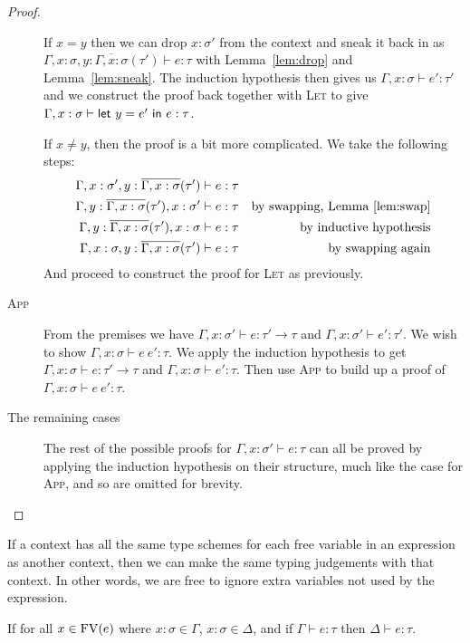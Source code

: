 \begin{proof}
\begin{description}
    If $x = y$ then we can drop $x :
    \sigma'$ from the context and sneak it back in as $\Gamma , x : \sigma, y :
    \overline{\Gamma, x : \sigma}(\tau') \vdash e : \tau$ with Lemma~\ref{lem:drop} and
    Lemma~\ref{lem:sneak}. The induction hypothesis then gives us $\Gamma ,
    x : \sigma \vdash e' : \tau'$ and we construct the proof back together with
    \textsc{Let} to give $\Gamma , x : \sigma \vdash \mathsf{let} \ y = e' \ \mathsf{in} \ e : \tau$.

    If $x \neq y$, then the proof is a bit more complicated. We take the
    following steps:
    \begin{align*}
      \Gamma , x : \sigma' , y : \overline{\Gamma, x : \sigma}(\tau') \vdash e : \tau \\
      \Gamma , y : \overline{\Gamma, x : \sigma}(\tau') , x : \sigma' \vdash e : \tau &&  \text{by
                                                            swapping,
                                                            Lemma~\ref{lem:swap}}
      \\
      \Gamma , y : \overline{\Gamma, x : \sigma}(\tau') , x : \sigma \vdash e : \tau && \text{by
                                                           inductive
                                                           hypothesis} \\
      \Gamma , x : \sigma , y : \overline{\Gamma, x : \sigma}(\tau') \vdash e : \tau && \text{by swapping again}
    \end{align*}
    And proceed to construct the proof for \textsc{Let} as previously.
  \item[\rm\textsc{App}]
    From the premises we have $\Gamma , x : \sigma' \vdash e : \tau' \rightarrow \tau$ and $\Gamma , x : \sigma' \vdash
    e' : \tau'$. We wish to show $\Gamma , x : \sigma \vdash e \ e' : \tau$.
    We apply the induction hypothesis to get $\Gamma , x : \sigma \vdash e : \tau' \rightarrow \tau$
    and  $\Gamma , x : \sigma \vdash e' : \tau$. Then use \textsc{App} to build up a
    proof of $\Gamma , x : \sigma \vdash e \ e' : \tau$.
  \item[The remaining cases] The rest of the possible proofs for
    $\Gamma , x : \sigma' \vdash e : \tau$ can all be proved by applying the
    induction hypothesis on their structure, much like the case for
    \textsc{App}, and so are omitted for brevity.
  \end{description}
\end{proof}

If a context has all the same type schemes for each free variable in
an expression as another context, then we can make the same typing
judgements with that context. In other words, we are free to ignore
extra variables not used by the expression.
\begin{lemma}\label{lem:ignore}
  If for all $x \in \operatorname{FV}(e)$ where $x : \sigma \in \Gamma$, $x : \sigma \in \Delta$, and if $\Gamma \vdash
  e : \tau$ then $\Delta \vdash e : \tau$.
\end{lemma}

